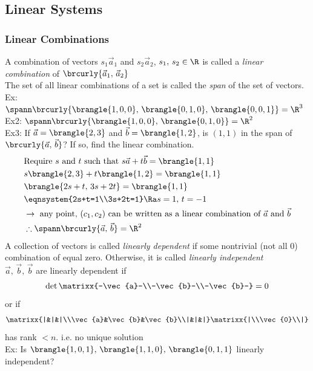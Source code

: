 \subsection{Linear Systems}
\subsubsection{Linear Combinations}
A combination of vectors $s_1\vec{a}_1$ and $s_2\vec{a}_2$, $s_1,\,s_2\in\R$ is called a \textit{linear combination} of $\brcurly{\vec{a}_1,\,\vec{a}_2}$\\
The set of all linear combinations of a set is called the \textit{span} of the set of vectors.\\
Ex: $\spann\brcurly{\brangle{1,0,0},\,\brangle{0,1,0},\,\brangle{0,0,1}}=\R^3$\\
Ex2: $\spann\brcurly{\brangle{1,0,0},\,\brangle{0,1,0}}=\R^2$\\
Ex3: If $\vec{a}=\brangle{2,3}$ and $\vec{b}=\brangle{1,2}$, is $(1,1)$ in the span of $\brcurly{\vec{a},\,\vec{b}}$? If so, find the linear combination.
\begin{align*}
    &\text{Require $s$ and $t$ such that }s\vec{a}+t\vec{b}=\brangle{1,1}\\
    &s\brangle{2,3}+t\brangle{1,2}=\brangle{1,1}\\
    &\brangle{2s+t,\,3s+2t}=\brangle{1,1}\\
    &\eqnsystem{2s+t=1\\3s+2t=1}\Ra s=1,\,t=-1\\
    &\to\text{ any point, }(c_1,c_2)\text{ can be written as a linear combination of }\vec{a}\text{ and }\vec{b}\\
    &\therefore\spann\brcurly{\vec{a},\,\vec{b}}=\R^2
\end{align*}
A collection of vectors is called \textit{linearly dependent} if some nontrivial (not all 0) combination of equal zero. Otherwise, it is called \textit{linearly independent}\\
$\vec{a},\,\vec{b},\,\vec{b}$ are linearly dependent if
$$\det\matrixx{-\vec{a}-\\-\vec{b}-\\-\vec{b}-}=0$$
or if
$$\matrixx{|&|&|\\\vec{a}&\vec{b}&\vec{b}\\|&|&|}\matrixx{|\\\vec{0}\\|}$$
has rank $<n$. i.e. no unique solution\\
Ex: Is $\brangle{1,0,1},\,\brangle{1,1,0},\,\brangle{0,1,1}$ linearly independent?
